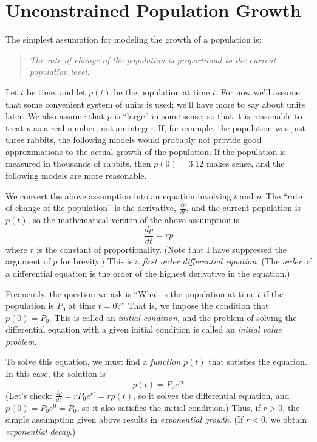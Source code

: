 \documentclass[reqno]{immbook}
\begin{document}
\section{Unconstrained Population Growth}


The simplest assumption for modeling the growth of a population
is:
\begin{quote}
\emph{The rate of change of the population is proportional to the current population level.}
\end{quote} 
Let $t$ be time, and let $p(t)$ be the population at time $t$.
For now we'll assume that some convenient system of units is used;
we'll have more to say about units later.
We also assume that $p$ is ``large'' in some sense, so that it is reasonable
to treat $p$ as a real number, not an integer.  If, for example, the population
was just three rabbits, the following models would probably not provide good
approximations to the actual growth of the population.  If the population
is measured in thousands of rabbits, then $p(0)=3.12$ makes sense,
and the following models are more reasonable.

We convert the above assumption into an equation involving $t$
and $p$.
The ``rate of change of the population'' is the derivative, $\frac{dp}{dt}$, and the
current population is $p(t)$, so the mathematical version of the above
assumption is
\begin{equation}
  \frac{dp}{dt} = rp
\end{equation}
where $r$ is the constant of proportionality.
(Note that I have suppressed the argument of $p$ for brevity.)
This is a \emph{first order differential equation}.
(The \emph{order} of a differential equation is the order of the
highest derivative in the equation.)

Frequently, the question we ask is ``What is the population at time $t$
if the population is $P_0$ at time $t=0$?''  That is, we impose the
condition that $p(0)=P_0$.  This is called an
\emph{initial condition}, and the problem of solving the differential
equation with a given initial condition is called an
\emph{initial value problem}.

To solve this equation, we must find a \emph{function} $p(t)$
that satisfies the equation.  In this case, the solution is
\begin{equation}
  p(t) = P_0 e^{rt}
\end{equation}
(Let's check:  $\frac{dp}{dt} = rP_0e^{rt} = r p(t)$, so  it solves the differential
equation, and $p(0) = P_0e^0 = P_0$, so it also satisfies the initial condition.)
Thus, if $r > 0$, the simple assumption given above results in
\emph{exponential growth}.
(If $r < 0$, we obtain \emph{exponential decay}.)
\end{document}
